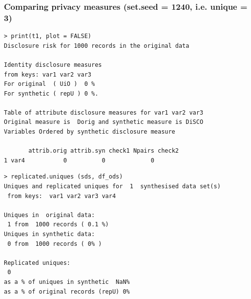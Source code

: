 \documentclass[t,8pt,utfx8]{beamer}
\begin{document}
\begin{spacing}{1.25}
\begin{frame}[fragile]
\frametitle{Comparing privacy measures (set.seed = 1240, i.e. unique = 3)}
  


\begin{minipage}[t]{0.48\textwidth}
\begin{lstlisting}
> print(t1, plot = FALSE)
Disclosure risk for 1000 records in the original data

Identity disclosure measures
from keys: var1 var2 var3 
For original  ( UiO )  0 %
For synthetic ( repU ) 0 %.

Table of attribute disclosure measures for var1 var2 var3 
Original measure is  Dorig and synthetic measure is DiSCO 
Variables Ordered by synthetic disclosure measure

       attrib.orig attrib.syn check1 Npairs check2
1 var4           0          0             0       
\end{lstlisting}
\end{minipage}%
  \hfill%
\begin{minipage}[t]{0.48\textwidth}
\begin{lstlisting}
> replicated.uniques (sds, df_ods)
Uniques and replicated uniques for  1  synthesised data set(s)
 from keys:  var1 var2 var3 var4 

Uniques in  original data:
 1 from  1000 records ( 0.1 %) 
Uniques in synthetic data:
 0 from  1000 records ( 0% )

Replicated uniques:
 0
as a % of uniques in synthetic  NaN%
as a % of original records (repU) 0%
\end{lstlisting}
\end{minipage}
\end{frame}




\end{spacing}
\end{document}
